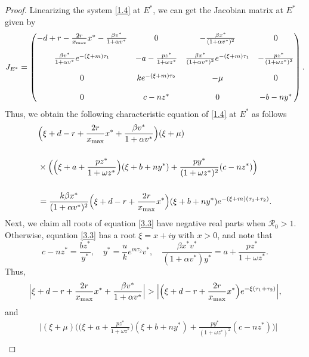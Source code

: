 \documentclass[reqno]{amsart}
\begin{document}
\begin{proof}
Linearizing the system \eqref{1.4} at $E^*$, we can get the Jacobian matrix at $E^{*}$  
given by	
\[
J_{E^{*}}
=\begin{pmatrix}
-d+r-\frac{2r}{x_{\rm max}}x^*-\frac{\beta v^{*}}{1+\alpha v^{*}}&0&-\frac{\beta x^{*}}{(1+\alpha v^{*})^{2}}&0\\[4mm]
\frac{\beta v^{*}}{1+\alpha v^{*}}e^{-(\xi+m)\tau_1}&-a-\frac{pz^{*}}{1+\omega z^{*}}&\frac{\beta x^{*}}{(1+\alpha v^{*})^{2}}e^{-(\xi+m)\tau_1}
&-\frac{pz^{*}}{(1+\omega z^{*})^{2}}\\[4mm]
 0&ke^{-(\xi+m)\tau_2}&-\mu&0\\[4mm]
 0&c-nz^{*}&0&-b-ny^{*}
 \end{pmatrix}.
\]
Thus, we obtain the following characteristic equation of \eqref{1.4} at $E^{*}$ 
as follows
\begin{equation} \label{3.3}
\begin{aligned}
&\Big(\xi+d-r+{\frac{2r}{x_{\rm max}}x^{*}}+\frac{\beta v^{*}}{1+\alpha v^{*}}\Big)(\xi+\mu)  \\[5mm]
&\times\Big(\Big(\xi+a+{\frac{pz^{*}}{1+\omega z^{*}}}\Big)
(\xi+b+ny^{*})+{\frac{py^{*}}{(1+\omega z^{*})^{2}}}(c-nz^{*})\Big)    \\[5mm]
&=\frac{k\beta x^*}{(1+\alpha v^*)^2}\Big(\xi+d-r+\frac{2r}{x_{\rm max}}x^{*}\Big)(\xi+b+ny^{*})e^{-(\xi+m)(\tau_1+\tau_2)}.
\end{aligned}
\end{equation}
Next, we claim all roots of equation \eqref{3.3} have negative real parts when
$\mathcal{R}_0>1$. Otherwise, equation \eqref{3.3} has a root $\xi=x+iy $ with
$x>0$, and note that
\begin{equation*}
c-nz^{*}=\frac{bz^{*}}{y^{*}}, \quad y^{*}=\frac{u}{k}e^{m\tau_2}v^{*},\quad
\frac{\beta x^{*}v^*}{(1+\alpha v^{*})y^{*} }=a+\frac{pz^{*}}{1+\omega z^{*}}.
\end{equation*}
Thus,
\begin{equation} \label{3.4}
\Big|\xi+d-r+\frac{2r}{x_{\rm max}}x^{*}+\frac{\beta v^{*}}{1+\alpha v^{*}}\Big|
>\Big|\Big(\xi+d-r+\frac{2r}{x_{\rm max}}x^{*}\Big)e^{-\xi(\tau_1+\tau_2)}\Big|,
\end{equation}
and
\begin{equation} \label{3.5}
\begin{aligned}
&\Big|(\xi+\mu)\Big(\Big(\xi+a+{\frac{pz^{*}}{1+\omega z^{*}}}\Big)
 (\xi+b+ny^{*})+{\frac{py^{*}}{(1+\omega z^{*})^{2}}}(c-nz^{*})\Big)\Big|  \\

\end{aligned}
\end{equation}
\end{proof}
\end{document}
